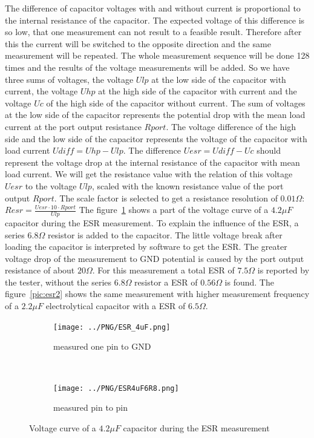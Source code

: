 The difference of capacitor voltages with and without current is proportional to the internal resistance of the capacitor. 
The expected voltage of this difference is so low, that one measurement can not result to a feasible result.
Therefore after this the current will be switched to the opposite direction and the same measurement will be repeated.
The whole measurement sequence will be done 128 times and the results of the voltage measurements will be added.
So we have three sums of voltages, the voltage \(Ulp\) at the low side of the capacitor with current, the voltage \(Uhp\) at
the high side of the capacitor with current and the voltage \(Uc\) of the high side of the capacitor without current.
The sum of voltages at the low side of the capacitor represents the potential drop with the mean load current at
the port output resistance \(Rport\). 
The voltage difference  of the high side and the low side of the capacitor represents the voltage of the capacitor with
load current \(Udiff = Uhp - Ulp\).
The difference \(Uesr = Udiff - Uc\) should represent the voltage drop at the internal resistance of the capacitor with
mean load current.
We will get the resistance value with the relation of this voltage \(Uesr\) to the voltage \(Ulp\), scaled with the
known resistance value of the port output \(Rport\).
The scale factor is selected to get a resistance resolution of \(0.01\Omega\):  \(Resr = \frac{Uesr \cdot 10 \cdot Rport}{Ulp}\)
The figure~\ref{pic:esr4} shows a part of the voltage curve of a \(4.2\mu F\) capacitor during the ESR measurement.
To explain the influence of the ESR, a series \(6.8\Omega\) resistor is added to the capacitor.
The little voltage break after loading the capacitor is interpreted by software to get the ESR.
The greater voltage drop of the measurement to GND potential is caused by the port output resistance of about \(20\Omega\).
For this measurement a total ESR of \(7.5\Omega\) is reported by the tester, without the series \(6.8\Omega\) resistor a ESR of \(0.56\Omega\) is found.
The figure~\ref{pic:esr2} shows the same measurement with higher measurement frequency of a \(2.2\mu F\) electrolytical capacitor
with a ESR of \(6.5\Omega\).


\begin{figure}[H]
  \begin{subfigure}[b]{.5\textwidth}
    \centering
    \texttt{[image: ../PNG/ESR\_4uF.png]}
    \caption{measured one pin to GND}
  \end{subfigure}
  ~
  \begin{subfigure}[b]{.5\textwidth}
    \centering
    \texttt{[image: ../PNG/ESR4uF6R8.png]}
    \caption{measured pin to pin}
  \end{subfigure}
  \caption{Voltage curve of a \(4.2\mu F\) capacitor during the ESR measurement}
  \label{pic:esr4}
\end{figure}


